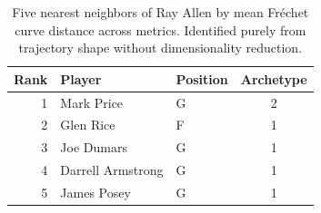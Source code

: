 \begin{table}[htbp]
  \centering\small
  \begin{tabular}{rllc}
    \toprule
    Rank & Player & Position & Archetype \\
    \midrule
    1 & Mark Price & G & 2 \\
    2 & Glen Rice & F & 1 \\
    3 & Joe Dumars & G & 1 \\
    4 & Darrell Armstrong & G & 1 \\
    5 & James Posey & G & 1 \\
    \bottomrule
  \end{tabular}
  \caption{Five nearest neighbors of Ray Allen by mean Fr\'{e}chet curve distance across metrics. Identified purely from trajectory shape without dimensionality reduction.}
  \label{tab:Ray_Allen_frechet_curve_neighbors}
\end{table}

